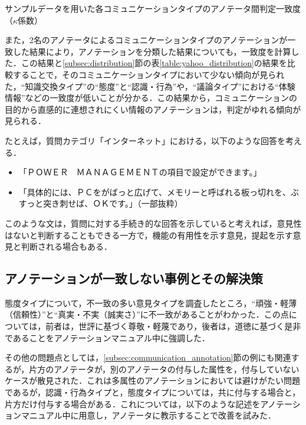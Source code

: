 \documentclass[japanese]{jnlp_1.4}
\begin{document}
\begin{table}[t]
\caption{サンプルデータを用いた各コミュニケーションタイプのアノテータ間判定一致度（$\kappa$係数）}
\label{table:kappa_communication}

\end{table}

また，2名のアノテータによるコミュニケーションタイプのアノテーションが一致した結果により，アノテーションを分類した結果についても，一致度を計算した．この結果と\ref{subsec:distribution}節の表\ref{table:yahoo_distribution}の結果を比較することで，そのコミュニケーションタイプにおいて少ない傾向が見られた，``知識交換タイプ''の``態度''と``認識・行為''や，``議論タイプ''における``体験情報''などの一致度が低いことが分かる．この結果から，コミュニケーションの目的から直感的に連想されにくい情報のアノテーションは，判定がゆれる傾向が見られる．

たとえば，質問カテゴリ「インターネット」における，以下のような回答を考える．

\begin{itemize}
\item 「ＰＯＷＥＲ　ＭＡＮＡＧＥＭＥＮＴの項目で設定ができます。」
\item 「具体的には、ＰＣをがばっと広げて、メモリーと呼ばれる板っ切れを、ぶすっと突き刺せば、ＯＫです。」（一部抜粋）
\end{itemize}
このような文は，質問に対する手続き的な回答を示していると考えれば，意見性はないと判断することもできる一方で，機能の有用性を示す意見，提起を示す意見と判断される場合もある．


\subsection{アノテーションが一致しない事例とその解決策}

態度タイプについて，不一致の多い意見タイプを調査したところ，``頑強・軽薄（信頼性）''と``真実・不実（誠実さ）''に不一致があることがわかった．この点については，前者は，世評に基づく尊敬・軽蔑であり，後者は，道徳に基づく是非であることをアノテーションマニュアル中に強調した．

その他の問題点としては，\ref{subsec:communication_annotation}節の例にも関連するが，片方のアノテータが，別のアノテータの付与した属性を，付与していないケースが散見された．これは多属性のアノテーションにおいては避けがたい問題であるが，認識・行為タイプと，態度タイプについては，共に付与する場合と，片方だけ付与する場合がある．これについては，以下のような記述をアノテーションマニュアル中に用意し，アノテータに教示することで改善を試みた．
\end{document}
